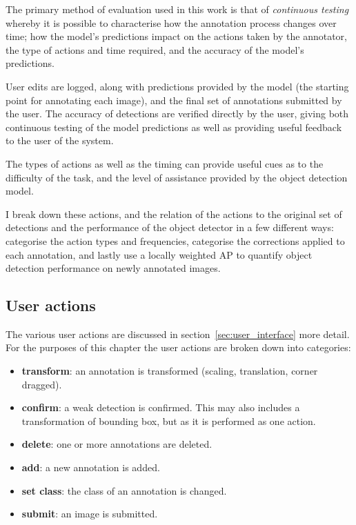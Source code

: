 The primary method of evaluation used in this work is that of \emph{continuous testing} whereby it is possible to characterise how the annotation process changes over time; how the model's predictions impact on the actions taken by the annotator, the type of actions and time required, and the accuracy of the model's predictions.

User edits are logged, along with predictions provided by the model (the starting point for annotating each image), and the final set of annotations submitted by the user. The accuracy of detections are verified directly by the user, giving both continuous testing of the model predictions as well as providing useful feedback to the user of the system. 

The types of actions as well as the timing can provide useful cues as to the difficulty of the task, and the level of assistance provided by the object detection model. 

I break down these actions, and the relation of the actions to the original set of detections and the performance of the object detector in a few different ways: categorise the action types and frequencies, categorise the corrections applied to each annotation, and lastly use a locally weighted \gls{AP} to quantify object detection performance on newly annotated images.

\subsection{User actions}

The various user actions are discussed in section~\ref{sec:user_interface} more detail. For the purposes of this chapter the user actions are broken down into categories:

\begin{itemize}
    \item {\bf transform}: an annotation is transformed (scaling, translation, corner dragged).
    \item {\bf confirm}: a weak detection is confirmed. This may also includes a transformation of bounding box, but as it is performed as one action.
    \item {\bf delete}: one or more annotations are deleted.
    \item {\bf add}: a new annotation is added.
    \item {\bf set class}: the class of an annotation is changed.    
    \item {\bf submit}: an image is submitted.    
\end{itemize}

